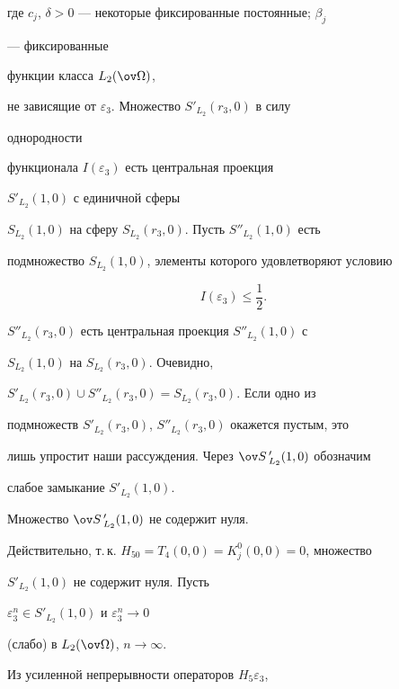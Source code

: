 где $c_j$, $\delta>0$ --- некоторые фиксированные постоянные; $\beta_j$ 


--- фиксированные 


функции класса $L_2(\ov\Omega)$, 


не зависящие от $\varepsilon_3$. Множество $S'_{L_2}(r_3,0)$ в силу 


однородности 


функционала $I(\varepsilon_3)$ есть центральная проекция 


$S'_{L_2}(1,0)$ с единичной сферы 


$S_{L_2}(1,0)$ на сферу $S_{L_2}(r_3,0)$. Пусть $S''_{L_2}(1,0)$ есть 


подмножество $S_{L_2}(1,0)$, элементы которого удовлетворяют условию 


\begin{equation} 


I(\varepsilon_3)\le\frac{1}{2}. 


\end{equation} 


$S''_{L_2}(r_3,0)$ есть центральная проекция $S''_{L_2}(1,0)$ с 


$S_{L_2}(1,0)$ на $S_{L_2}(r_3,0)$. Очевидно, 


$S'_{L_2}(r_3,0)\cup S''_{L_2}(r_3,0)=S_{L_2}(r_3,0)$. Если одно из 


подмножеств $S'_{L_2}(r_3,0)$, $S''_{L_2}(r_3,0)$ окажется пустым, это 


лишь упростит наши рассуждения. Через $\ov S\,{}'_{L_2}(1,0)$ обозначим 


слабое замыкание $S'_{L_2}(1,0)$. 


 


\begin{lem} 


Множество $\ov S\,{}'_{L_2}(1,0)$ не содержит нуля. 


\end{lem} 


 


Действительно, т.\,к. $H_50=T_4(0,0)=K^0_j(0,0)=0$, множество 


$S'_{L_2}(1,0)$ не содержит нуля. Пусть 


$\varepsilon^n_3\in S'_{L_2}(1,0)$ и $\varepsilon^n_3\to 0$ 


(слабо) в $L_2(\ov\Omega)$, $n\to\infty$. 


Из усиленной непрерывности операторов $H_5\varepsilon_3$, 


